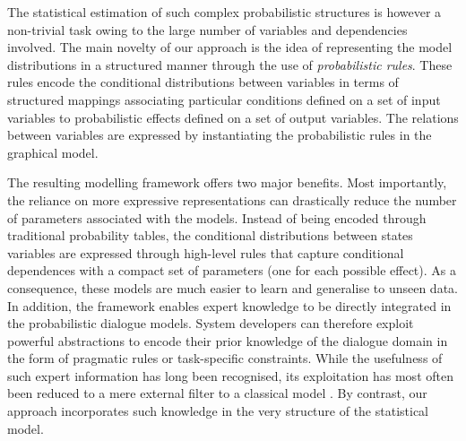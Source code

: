 The statistical estimation of such complex probabilistic structures is however a non-trivial task owing to the large number of variables and dependencies involved. The main novelty of our approach is the idea of representing the model distributions in a structured manner through the use of \textit{probabilistic rules}.  These rules encode the conditional distributions between variables in terms of structured mappings associating particular conditions defined on a set of input variables to probabilistic effects defined on a set of output variables.  The relations between variables are expressed by instantiating the probabilistic rules in the graphical model. 

The resulting modelling framework offers two major benefits. Most importantly, the reliance on more expressive representations can drastically reduce the number of parameters associated with the models.  Instead of being encoded through traditional probability tables, the conditional distributions between states variables are expressed through high-level rules that capture conditional dependences with a compact set of parameters (one for each possible effect). As a consequence, these models are much easier to learn and generalise to unseen data.  In addition, the framework enables expert knowledge to be directly integrated in the probabilistic dialogue models. System developers can therefore exploit powerful abstractions to encode their prior knowledge of the dialogue domain in the form of pragmatic rules or task-specific constraints.    
While the usefulness of such expert information has long been recognised, its exploitation has most often been reduced to a mere external filter to a classical model \citep{heeman2007,williams2008}. By contrast, our approach incorporates such knowledge in the very structure of the statistical model.

